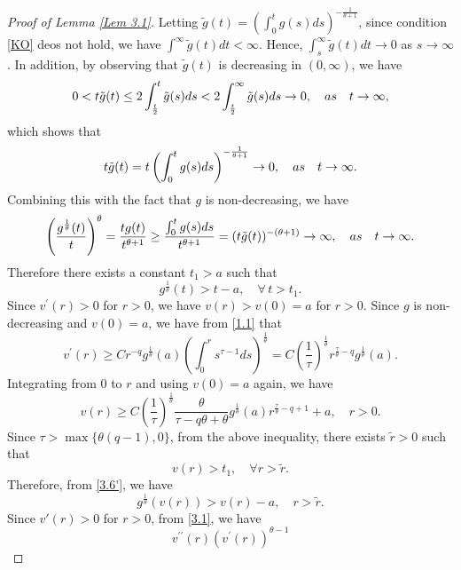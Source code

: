 \documentclass[10pt,a4paper]{amsart}
\begin{document}
\begin{proof}[Proof of Lemma \ref{Lem 3.1}]
Letting
$\tilde g(t)=\left( \int_{0}^{t}g (s)ds\right)^{-\frac{1}{\theta+1}}$, since condition \eqref{KO} deos not hold, we have  $\int^{\infty}\tilde g(t) dt<\infty$. Hence, $\int_s^{\infty}\tilde g(t)dt\to 0$ as $s\to \infty$. In addition, by observing that $\tilde g(t)$ is decreasing in $(0, \infty)$, we have
\begin{equation*}
	0<t \tilde g(t)\leq 2\int_{\frac{t}{2}}^{t}\tilde g(s)ds
	<2\int_{\frac{t}{2}}^{\infty}\tilde g(s)ds \to 0, \quad {\rm as} \quad t\to \infty,
\end{equation*}
which shows that
\begin{equation*}
	t \tilde g(t)=t \left( \int_{0}^{t}g (s)ds\right)^{-\frac{1}{\theta+1}}\to 0,\quad {\rm as} \quad t\to \infty.
\end{equation*}
Combining this with the fact that $g$ is non-decreasing, we have
\begin{equation*}
	\left(\frac{ g^{\frac{1}{\theta}}(t)}{t} \right)^\theta =\frac{t g(t)}{t^{\theta+1}}
	\geq\frac{\int_{0}^{t}g(s)ds}{t^{\theta+1}}=(t\tilde g(t))^{-(\theta+1)}\to \infty, \quad {\rm as} \quad t\to \infty.
\end{equation*}
Therefore there exists a constant $t_1 > a$ such that 	
\begin{equation}\label{3.6'}
	g^{\frac{1}{\theta}}(t)>t-a,\quad \forall \,t>t_1.
\end{equation}
Since $v^{\prime}(r)>0$ for $r>0$, we have $v(r)>v(0)=a$ for $r>0$.
Since $g$ is non-decreasing and $v(0)=a$, we have from \eqref{1.1} that 
$$v^\prime(r) \ge Cr^{-q}g^{\frac{1}{\theta}}(a)\left (\int_0^r s^{\tau-1} ds \right)^{\frac{1}{\theta}} = C\left (\frac{1}{\tau}\right)^{\frac{1}{\theta}}r^{\frac{\tau}{\theta}-q} g^{\frac{1}{\theta}}(a).$$
Integrating from $0$ to $r$ and using $v(0)=a$ again, we have
$$v(r)\geq C\left (\frac{1}{\tau}\right)^{\frac{1}{\theta}} \frac{\theta}{\tau - q \theta + \theta}g^{\frac{1}{\theta}}(a) r^{\frac{\tau}{\theta}-q+1}  +a, \quad   r>0.$$
Since $\tau > \max \{\theta (q-1), 0\}$, from the above inequality, there exists $\tilde r>0$ such that
$$v(r)>t_1, \quad {\forall} r>\tilde r.$$
Therefore,  from \eqref{3.6'}, we have
\begin{equation}\label{3.10}
	g^{\frac{1}{\theta}}(v(r))>v(r)-a, \quad   r>\tilde r.
\end{equation}
Since $v'(r)>0$ for $r>0$, from \eqref{3.1}, we have
\begin{equation*}
v^{\prime\prime}(r)\left( v^{\prime}(r)\right)^{\theta - 1}

\end{equation*}
\end{proof}
\end{document}
